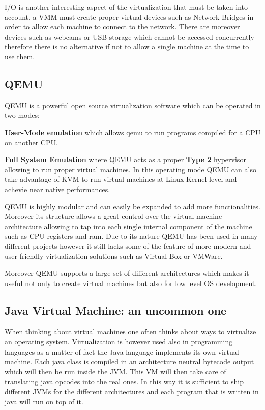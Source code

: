 I/O is another interesting aspect of the virtualization that must be taken into account, a VMM must create proper virtual devices such as Network Bridges in order to allow each machine to connect to the network. There are moreover devices such as webcams or USB storage which cannot be accessed concurrently therefore there is no alternative if not to allow a single machine at the time to use them.

\subsection{QEMU}

QEMU is a powerful open source virtualization software which can be operated in two modes: 

\textbf{User-Mode emulation} which allows qemu to run programs compiled for a CPU on another CPU.

\textbf{Full System Emulation} where QEMU acts as a proper \textbf{Type 2} hypervisor allowing to run proper virtual machines. In this operating mode QEMU can also take advantage of KVM to run virtual machines at Linux Kernel level and achevie near native performances. 

QEMU is highly modular and can easily be expanded to add more functionalities. Moreover its structure allows a great control over the virtual machine architecture allowing to tap into each single internal component of the machine such as CPU registers and ram. Due to its nature QEMU has been used in many different projects however it still lacks some of the feature of more modern and user friendly virtualization solutions such as Virtual Box or VMWare.

Moreover QEMU supports a large set of different architectures which makes it useful not only to create virtual machines but also for low level OS development.

\subsection{Java Virtual Machine: an uncommon one}

When thinking about virtual machines one often thinks about ways to virtualize an operating system. Virtualization is however used also in programming languages as a matter of fact the Java language implements its own virtual machine. Each java class is compiled in an architecture neutral bytecode output which will then be run inside the JVM. This VM will then take care of translating java opcodes into the real ones. In this way it is sufficient to ship different JVMs for the different architectures and each program that is written in java will run on top of it.  
